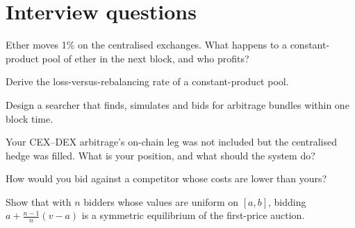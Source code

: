 \section{Interview questions}

\begin{interviewq}\label{iq:hf:on-chain-trading:1}
Ether moves 1\% on the centralised exchanges. What happens to a constant-product pool of ether in the next block, and who profits?
\end{interviewq}

\begin{interviewq}\label{iq:hf:on-chain-trading:2}
Derive the loss-versus-rebalancing rate of a constant-product pool.
\end{interviewq}

\begin{interviewq}\label{iq:hf:on-chain-trading:3}
Design a searcher that finds, simulates and bids for arbitrage bundles within one block time.
\end{interviewq}

\begin{interviewq}\label{iq:hf:on-chain-trading:4}
Your CEX--DEX arbitrage's on-chain leg was not included but the centralised hedge was filled. What is your position, and what should the system do?
\end{interviewq}

\begin{interviewq}\label{iq:hf:on-chain-trading:5}
How would you bid against a competitor whose costs are lower than yours?
\end{interviewq}

\begin{interviewq}\label{iq:hf:on-chain-trading:6}
Show that with $n$ bidders whose values are uniform on $[a,b]$, bidding $a+\frac{n-1}{n}(v-a)$ is a symmetric equilibrium of the first-price
auction.
\end{interviewq}

